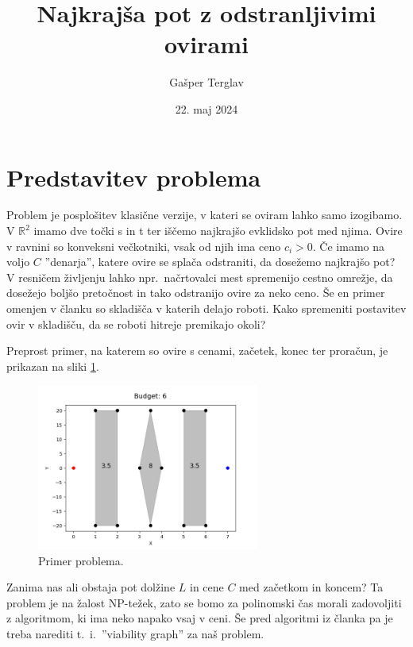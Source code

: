 \documentclass{article}
\author{Gašper Terglav}
\date{22. maj 2024}
\title{Najkrajša pot z odstranljivimi ovirami}
\begin{document}
\maketitle


\section*{Predstavitev problema}

Problem je posplošitev klasične verzije, v kateri se oviram lahko samo izogibamo. V $\mathbb{R}^2$ imamo dve točki s in t ter iščemo najkrajšo evklidsko pot med njima. Ovire v ravnini so konveksni večkotniki, vsak od njih ima ceno $c_i > 0$. Če imamo na voljo $C$ ''denarja'', katere ovire se splača odstraniti, da dosežemo najkrajšo pot? V resničem življenju lahko npr.\ načrtovalci mest spremenijo cestno omrežje, da dosežejo boljšo pretočnost in tako odstranijo ovire za neko ceno. Še en primer omenjen v članku so skladišča v katerih delajo roboti. Kako spremeniti postavitev ovir v skladišču, da se roboti hitreje premikajo okoli? 

Preprost primer, na katerem so ovire s cenami, začetek, konec ter proračun, je prikazan na sliki \ref{fig:errPr1}.

\begin{figure}[ht]
    \centering
    \includegraphics[width=0.65\textwidth]{err1.png}
    \caption{Primer problema.}
    \label{fig:errPr1}
\end{figure}


Zanima nas ali obstaja pot dolžine $L$ in cene $C$ med začetkom in koncem? Ta problem je na žalost NP-težek, zato se bomo za polinomski čas morali zadovoljiti z algoritmom, ki ima neko napako vsaj v ceni. Še pred algoritmi iz članka pa je treba narediti t.~i.\ ''viability graph'' za naš problem.



\end{document}
